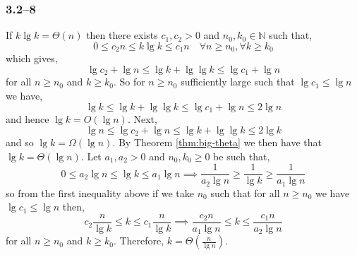 \subsubsection*{3.2--8}

If $k\lg k = \Theta(n)$ then there exists $c_{1},c_{2}>0$ and $n_{0},k_{0}\in\mathbb{N}$ such that,
\begin{equation*}
	0\leq c_{2}n\leq k\lg k \leq c_{1}n\quad\forall n\geq n_{0}, \forall k\geq k_{0}
\end{equation*}
which gives,
\begin{equation*}
	\lg c_{2} + \lg n \leq \lg k + \lg\lg k \leq \lg c_{1} + \lg n
\end{equation*}
for all $n\geq n_{0}$ and $k\geq k_{0}$. So for $n\geq n_{0}$ sufficiently large such that $\lg c_{1}\leq \lg n$ we have,
\begin{equation*}
	\lg k \leq \lg k + \lg\lg k \leq \lg c_{1} + \lg n \leq 2\lg n
\end{equation*}
and hence $\lg k = O(\lg n)$. Next,
\begin{equation*}
	\lg n \leq \lg c_{2} + \lg n \leq \lg k + \lg\lg k \leq 2\lg k
\end{equation*}
and so $\lg k = \Omega(\lg n)$. By Theorem \ref{thm:big-theta} we then have that $\lg k = \Theta(\lg n)$. Let $a_{1},a_{2}>0$ and $n_{0},k_{0}\geq 0$ be such that,
\begin{equation*}
	0 \leq a_{2}\lg n \leq \lg k \leq a_{1}\lg n \implies \frac{1}{a_{2}\lg n}\geq \frac{1}{\lg k}\geq \frac{1}{a_{1}\lg n}
\end{equation*}
so from the first inequality above if we take $n_{0}$ such that for all $n\geq n_{0}$ we have $\lg c_{1}\leq\lg n$ then,
\begin{equation*}
	c_{2}\frac{n}{\lg k} \leq k \leq c_{1}\frac{n}{\lg k} \implies\frac{c_{2}n}{a_{1}\lg n}\leq k \leq \frac{c_{1}n}{a_{2}\lg n}
\end{equation*}
for all $n\geq n_{0}$ and $k\geq k_{0}$. Therefore, $k=\Theta\left(\frac{n}{\lg n}\right)$.
